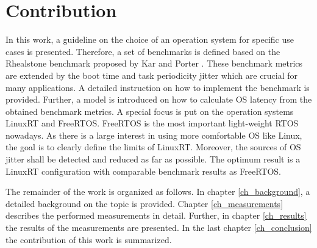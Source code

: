 \section{Contribution}
In this work, a guideline on the choice of an operation system for specific use cases is presented.
Therefore, a set of benchmarks is defined based on the Rhealstone benchmark proposed by Kar and Porter \cite{kar:itrb} \cite{kar:artbp}. 
These benchmark metrics are extended by the boot time and task periodicity jitter which are crucial for many applications.
A detailed instruction on how to implement the benchmark is provided.
Further, a model is introduced on how to calculate OS latency from the obtained benchmark metrics. 
A special focus is put on the operation systems LinuxRT and FreeRTOS. 
FreeRTOS is the most important light-weight \ac{RTOS} nowadays.
As there is a large interest in using more comfortable \ac{OS} like Linux, the goal is to clearly define the limits of LinuxRT.
Moreover, the sources of OS jitter shall be detected and reduced as far as possible. 
The optimum result is a LinuxRT configuration with comparable benchmark results as FreeRTOS. 

\par
The remainder of the work is organized as follows. In chapter \ref{ch_background}, a detailed background on the topic is provided. 
Chapter \ref{ch_measurements} describes the performed measurements in detail. 
Further, in chapter \ref{ch_results} the results of the measurements are presented. 
In the last chapter \ref{ch_conclusion} the contribution of this work is summarized.